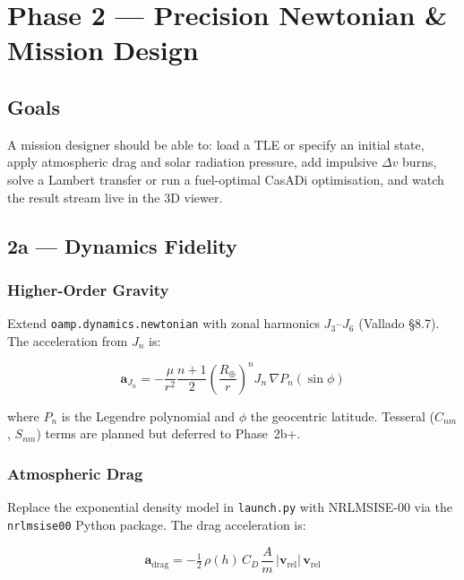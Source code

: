 \documentclass[11pt, a4paper]{article}
\begin{document}
\newpage
\section{Phase 2 — Precision Newtonian \& Mission Design}

\subsection{Goals}

A mission designer should be able to: load a TLE or specify an initial state,
apply atmospheric drag and solar radiation pressure, add impulsive $\Delta v$
burns, solve a Lambert transfer or run a fuel-optimal CasADi optimisation, and
watch the result stream live in the 3D viewer.

\subsection{2a — Dynamics Fidelity}

\subsubsection{Higher-Order Gravity}

Extend \texttt{oamp.dynamics.newtonian} with zonal harmonics $J_3$--$J_6$
(Vallado §8.7). The acceleration from $J_n$ is:

\begin{equation}
  \mathbf{a}_{J_n} = -\frac{\mu}{r^2} \frac{n+1}{2}
    \left(\frac{R_\oplus}{r}\right)^n J_n \,
    \nabla P_n(\sin\phi)
\end{equation}

where $P_n$ is the Legendre polynomial and $\phi$ the geocentric latitude.
Tesseral ($C_{nm}$, $S_{nm}$) terms are planned but deferred to Phase~2b+.

\subsubsection{Atmospheric Drag}

Replace the exponential density model in \texttt{launch.py} with
NRLMSISE-00 via the \texttt{nrlmsise00} Python package. The drag acceleration
is:

\begin{equation}
  \mathbf{a}_\text{drag} = -\tfrac{1}{2}\, \rho(h)\, C_D\, \frac{A}{m}\,
    |\mathbf{v}_\text{rel}|\,\mathbf{v}_\text{rel}
\end{equation}
\end{document}
